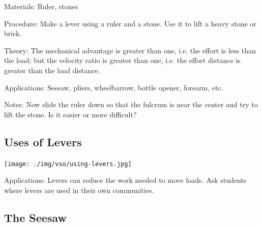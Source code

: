 \begin{multicols}{2}
\begin{description*}
\item[Materials:]{Ruler, stones}
\item[Procedure:]{Make a lever using a ruler and a stone. Use it to lift a heavy stone or brick.}
\item[Theory:]{The mechanical advantage is greater than one, i.e. the effort is less than the load; but the velocity ratio is greater than one, i.e. the effort distance is greater than the load distance.}
\item[Applications:]{Seesaw, pliers, wheelbarrow, bottle opener, forearm, etc.}
\item[Notes:]{Now slide the ruler down so that the fulcrum is near the center and try to lift the stone. Is it easier or more difficult?}
\end{description*}

\vfill
\columnbreak

\subsection{Uses of Levers}

\begin{center}
\texttt{[image: ./img/vso/using-levers.jpg]}
\end{center}

\begin{description*}
\item[Applications:]{Levers can reduce the work needed to move loads.
Ask students where levers are used in their own communities.}
\end{description*}

\subsection{The Seesaw}


\end{multicols}
